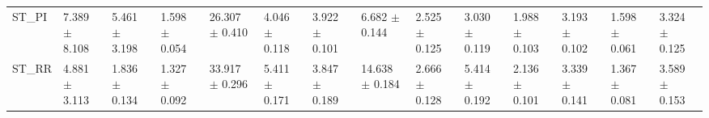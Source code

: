 \begin{tabular}{llllllllllllll}
ST_PI     &   7.389 $ \pm $ 8.108 &  5.461 $ \pm $ 3.198 &  1.598 $ \pm $ 0.054 &  26.307 $ \pm $ 0.410 &   4.046 $ \pm $ 0.118 &   3.922 $ \pm $ 0.101 &   6.682 $ \pm $ 0.144 &   2.525 $ \pm $ 0.125 &   3.030 $ \pm $ 0.119 &  1.988 $ \pm $ 0.103 &   3.193 $ \pm $ 0.102 &  1.598 $ \pm $ 0.061 &   3.324 $ \pm $ 0.125 \\
ST_RR     &   4.881 $ \pm $ 3.113 &  1.836 $ \pm $ 0.134 &  1.327 $ \pm $ 0.092 &  33.917 $ \pm $ 0.296 &   5.411 $ \pm $ 0.171 &   3.847 $ \pm $ 0.189 &  14.638 $ \pm $ 0.184 &   2.666 $ \pm $ 0.128 &   5.414 $ \pm $ 0.192 &  2.136 $ \pm $ 0.101 &   3.339 $ \pm $ 0.141 &  1.367 $ \pm $ 0.081 &   3.589 $ \pm $ 0.153 \\
\bottomrule
\end{tabular}
